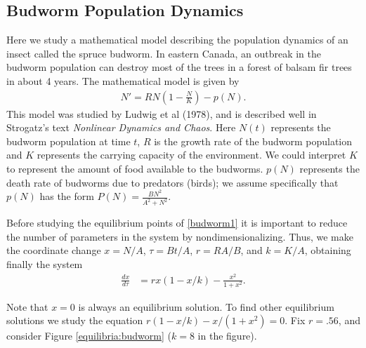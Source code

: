\subsection*{Budworm Population Dynamics}
Here we study a mathematical model describing the population dynamics of an insect called the spruce budworm.
In eastern Canada, an outbreak in the budworm population can destroy most of the trees in a forest of balsam fir trees in about 4 years.
The mathematical model is given by
\begin{align}
N' = RN\left(1 - \frac{N}{K}\right) - p(N). \label{budworm1}
\end{align}
This model was studied by Ludwig et al (1978), and is described well in Strogatz's text \emph{Nonlinear Dynamics and Chaos}.
Here $N(t)$ represents the budworm population at time $t$, $R$ is the growth rate of the budworm population and $K$ represents the carrying capacity of the environment.
We could interpret $K$ to represent the amount of food available to the budworms.
$p(N)$ represents the death rate of budworms due to predators (birds); we assume specifically that $p(N)$ has the form $P(N) = \frac{BN^2}{A^2 + N^2}$.

Before studying the equilibrium points of \eqref{budworm1} it is important to reduce the number of parameters in the system by nondimensionalizing.
Thus, we make the coordinate change $x = N/A$, $\tau = Bt/A$, $r = RA/B$, and $k = K/A$, obtaining finally the system
\begin{align}
	\frac{dx}{d \tau} &= rx(1-x/k) - \frac{x^2}{1+x^2}.
\end{align}

Note that $x = 0$ is always an equilibrium solution.
To find other equilibrium solutions we study the equation $r(1-x/k)-x/(1+x^2) = 0$.
Fix $r = .56$, and consider Figure \eqref{equilibria:budworm} ($k=8$ in the figure).

